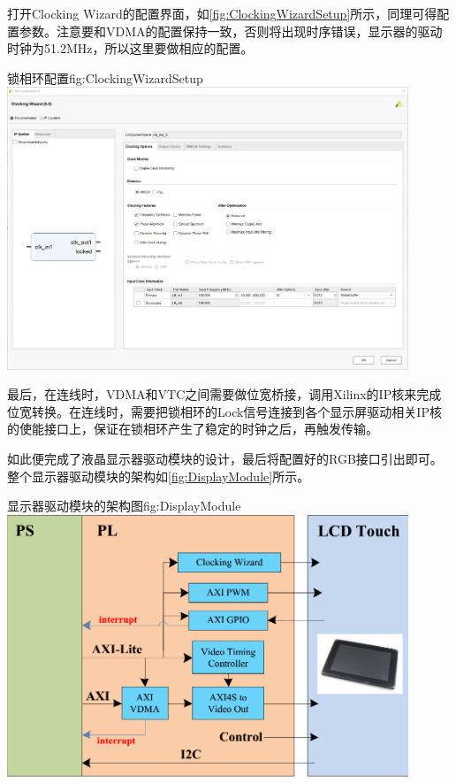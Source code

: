 \documentclass[supercite]{HustGraduPaper}
\begin{document}
	打开Clocking Wizard的配置界面，如\autoref{fig:ClockingWizardSetup}所示，同理可得配置参数。注意要和VDMA的配置保持一致，否则将出现时序错误，显示器的驱动时钟为51.2MHz，所以这里要做相应的配置。
	\begin{generalfig}[htb]{锁相环配置}{fig:ClockingWizardSetup}
		\includegraphics[width=12cm]{Figures/ClockingWizardSetup.png}
	\end{generalfig}
	
	最后，在连线时，VDMA和VTC之间需要做位宽桥接，调用Xilinx的IP核来完成位宽转换。在连线时，需要把锁相环的Lock信号连接到各个显示屏驱动相关IP核的使能接口上，保证在锁相环产生了稳定的时钟之后，再触发传输。
	
	如此便完成了液晶显示器驱动模块的设计，最后将配置好的RGB接口引出即可。整个显示器驱动模块的架构如\autoref{fig:DisplayModule}所示。
	\begin{generalfig}[htb]{显示器驱动模块的架构图}{fig:DisplayModule}
		\includegraphics[width=12cm]{Figures/DisplayModule.png}
	\end{generalfig}
	
\end{document}

